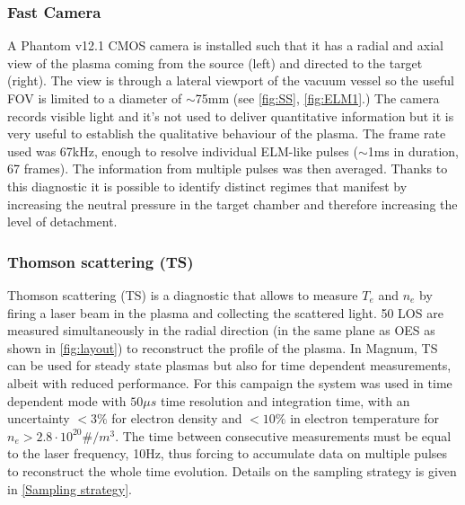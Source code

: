 \subsubsection{Fast Camera}\label{Fast Camera1}
A Phantom v12.1 CMOS camera is installed such that it has a radial and axial view of the plasma coming from the source (left) and directed to the target (right). The view is through a lateral viewport of the vacuum vessel so the useful FOV is limited to a diameter of $\sim$75mm (see \autoref{fig:SS}, \ref{fig:ELM1}.) The camera records visible light and it’s not used to deliver quantitative information but it is very useful to establish the qualitative behaviour of the plasma. The frame rate used was 67kHz, enough to resolve individual ELM-like pulses ($\sim$1ms in duration, 67 frames). The information from multiple pulses was then averaged. Thanks to this diagnostic it is possible to identify distinct regimes that manifest by increasing the neutral pressure in the target chamber and therefore increasing the level of detachment.
\subsubsection{Thomson scattering (TS)}\label{Thomson scattering1}
Thomson scattering (TS) is a diagnostic that allows to measure $T_e$ and $n_e$ by firing a laser beam in the plasma and collecting the scattered light. 50 LOS are measured simultaneously in the radial direction (in the same plane as OES as shown in \autoref{fig:layout}) to reconstruct the profile of the plasma. In Magnum, TS can be used for steady state plasmas but also for time dependent measurements, albeit with reduced performance. For this campaign the system was used in time dependent mode with $50\mu s$ time resolution and integration time, with an uncertainty $<3\%$ for electron density and $<10\%$ in electron temperature for $n_e>2.8 \cdot 10^{20} \#/m^3$. The time between consecutive measurements must be equal to the laser frequency, 10Hz, thus forcing to accumulate data on multiple pulses to reconstruct the whole time evolution. \cite{VanDerMeiden2012} Details on the sampling strategy is given in \autoref{Sampling strategy}.
